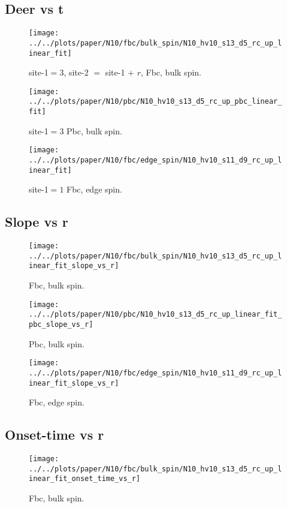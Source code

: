 \documentclass[a4paper]{article}
\begin{document}
\subsection{Deer vs t}
\begin{figure}[h]
  \centering
  \texttt{[image: ../../plots/paper/N10/fbc/bulk\_spin/N10\_hv10\_s13\_d5\_rc\_up\_linear\_fit]}
  \caption{site-1$=3$, site-2 $=$ site-1 $+$ $r$, Fbc, bulk spin.}
\end{figure}

\begin{figure}[h]
  \centering
  \texttt{[image: ../../plots/paper/N10/pbc/N10\_hv10\_s13\_d5\_rc\_up\_pbc\_linear\_fit]}
  \caption{site-1$=3$ Pbc, bulk spin.}
\end{figure}

\begin{figure}[h]
  \centering
  \texttt{[image: ../../plots/paper/N10/fbc/edge\_spin/N10\_hv10\_s11\_d9\_rc\_up\_linear\_fit]}
  \caption{site-1$=1$ Fbc, edge spin.}
\end{figure}

\clearpage
\subsection{Slope vs r}
\begin{figure}[h]
  \centering
  \texttt{[image: ../../plots/paper/N10/fbc/bulk\_spin/N10\_hv10\_s13\_d5\_rc\_up\_linear\_fit\_slope\_vs\_r]}
  \caption{Fbc, bulk spin.}
\end{figure}

\begin{figure}[h]
  \centering
  \texttt{[image: ../../plots/paper/N10/pbc/N10\_hv10\_s13\_d5\_rc\_up\_linear\_fit\_pbc\_slope\_vs\_r]}
  \caption{Pbc, bulk spin.}
\end{figure}

\begin{figure}[h]
  \centering
  \texttt{[image: ../../plots/paper/N10/fbc/edge\_spin/N10\_hv10\_s11\_d9\_rc\_up\_linear\_fit\_slope\_vs\_r]}
  \caption{Fbc, edge spin.}
\end{figure}


\clearpage
\subsection{Onset-time vs r}
\begin{figure}[h]
  \centering
  \texttt{[image: ../../plots/paper/N10/fbc/bulk\_spin/N10\_hv10\_s13\_d5\_rc\_up\_linear\_fit\_onset\_time\_vs\_r]}
  \caption{Fbc, bulk spin.}
\end{figure}
\end{document}
